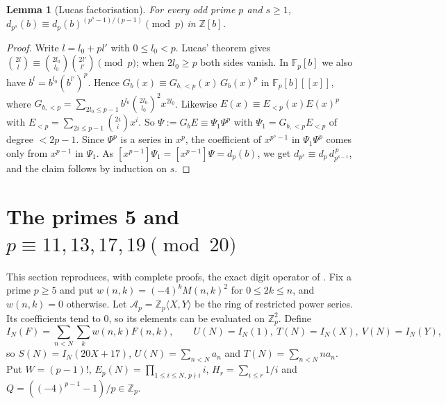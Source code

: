 \documentclass[11pt]{amsart}
\newtheorem{lemma}[theorem]{Lemma}
\theoremstyle{definition}
\theoremstyle{remark}
\newcommand{\Z}{\mathbb{Z}}
\newcommand{\F}{\mathbb{F}}
\newcommand{\Zp}{\mathbb{Z}_p}
\begin{document}
\begin{lemma}[Lucas factorisation]\label{lem:lucas}
For every odd prime $p$ and $s\ge1$, $d_{p^s}(b)\equiv d_p(b)^{(p^s-1)/(p-1)}\pmod p$ in $\Z[b]$.
\end{lemma}
\begin{proof}
Write $l=l_0+pl'$ with $0\le l_0<p$. Lucas' theorem gives
$\binom{2l}l\equiv\binom{2l_0}{l_0}\binom{2l'}{l'}\pmod p$; when $2l_0\ge p$ both sides vanish. In
$\F_p[b]$ we also have $b^l=b^{l_0}(b^{l'})^p$. Hence $G_b(x)\equiv G_{b,<p}(x)\,G_b(x)^p$ in
$\F_p[b][[x]]$, where $G_{b,<p}=\sum_{2l_0\le p-1}b^{l_0}\binom{2l_0}{l_0}^2x^{2l_0}$. Likewise
$E(x)\equiv E_{<p}(x)E(x)^p$ with $E_{<p}=\sum_{2i\le p-1}\binom{2i}ix^i$. So
$\Psi:=G_bE\equiv\Psi_1\Psi^p$ with $\Psi_1=G_{b,<p}E_{<p}$ of degree $<2p-1$. Since
$\Psi^p$ is a series in $x^p$, the coefficient of $x^{p^s-1}$ in $\Psi_1\Psi^p$ comes only from
$x^{p-1}$ in $\Psi_1$. As $[x^{p-1}]\Psi_1=[x^{p-1}]\Psi=d_p(b)$, we get
$d_{p^s}\equiv d_p\,d_{p^{s-1}}^{\,p}$, and the claim follows by induction on $s$.
\end{proof}

\section{The primes 5 and \texorpdfstring{$p\equiv11,13,17,19\pmod{20}$}{inert primes}}\label{sec:inert}

This section reproduces, with complete proofs, the exact digit operator of \cite[\S\S5--6]{K26}.
Fix a prime $p\ge5$ and put $w(n,k)=(-4)^kM(n,k)^2$ for $0\le2k\le n$, and $w(n,k)=0$ otherwise.
Let $\mathcal A_p=\Zp\langle X,Y\rangle$ be the ring of restricted power series. Its coefficients
tend to $0$, so its elements can be evaluated on $\Zp^2$. Define
\[
 I_N(F)=\sum_{n<N}\sum_kw(n,k)F(n,k),\qquad U(N)=I_N(1),\ T(N)=I_N(X),\ V(N)=I_N(Y),
\]
so $S(N)=I_N(20X+17)$, $U(N)=\sum_{n<N}a_n$ and $T(N)=\sum_{n<N}na_n$. Put $W=(p-1)!$,
$E_p(N)=\prod_{1\le i\le N,\,p\nmid i}i$, $H_r=\sum_{i\le r}1/i$ and
$Q=((-4)^{p-1}-1)/p\in\Zp$.
\end{document}
